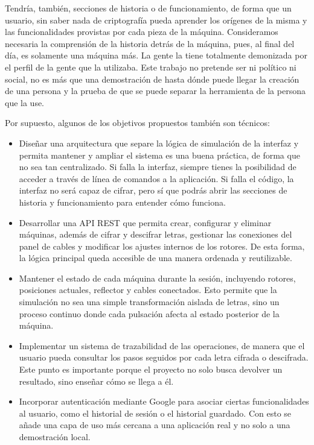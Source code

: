 Tendría, también, secciones de historia o de funcionamiento, 
de forma que un usuario, sin saber nada de criptografía pueda aprender los orígenes de la misma 
y las funcionalidades provistas por cada pieza de la máquina. Consideramos necesaria la comprensión
de la historia detrás de la máquina, pues, al final del día, es solamente una máquina más.
La gente la tiene totalmente demonizada por el perfil de la gente que la utilizaba. Este trabajo no 
pretende ser ni político ni social, no es más que una demostración de hasta dónde puede llegar 
la creación de una persona y la prueba de que se puede separar la herramienta de la persona que la use.

Por supuesto, algunos de los objetivos propuestos también son técnicos:

\begin{itemize}
	\item Diseñar una arquitectura que separe la lógica de simulación de la interfaz y
	permita mantener y ampliar el sistema es una buena práctica, de forma que no sea tan centralizado.
	Si falla la interfaz, siempre tienes la posibilidad de acceder a través de línea de comandos a la aplicación.
	Si falla el código, la interfaz no será capaz de cifrar, pero sí que podrás abrir las secciones de historia y 
	funcionamiento para entender cómo funciona.
	\item Desarrollar una API REST que permita crear, configurar y eliminar máquinas, además de cifrar y descifrar letras,
	gestionar las conexiones del panel de cables y modificar los ajustes internos de los rotores. De esta forma,
	la lógica principal queda accesible de una manera ordenada y reutilizable.
	\item Mantener el estado de cada máquina durante la sesión, incluyendo rotores, posiciones actuales, reflector y
	cables conectados. Esto permite que la simulación no sea una simple transformación aislada de letras, sino un
	proceso continuo donde cada pulsación afecta al estado posterior de la máquina.
	\item Implementar un sistema de trazabilidad de las operaciones, de manera que el usuario pueda consultar los pasos
	seguidos por cada letra cifrada o descifrada. Este punto es importante porque el proyecto no solo busca devolver
	un resultado, sino enseñar cómo se llega a él.
	\item Incorporar autenticación mediante Google para asociar ciertas funcionalidades al usuario, como el historial
	de sesión o el historial guardado. Con esto se añade una capa de uso más cercana a una aplicación real y no solo a
	una demostración local.
\end{itemize}


